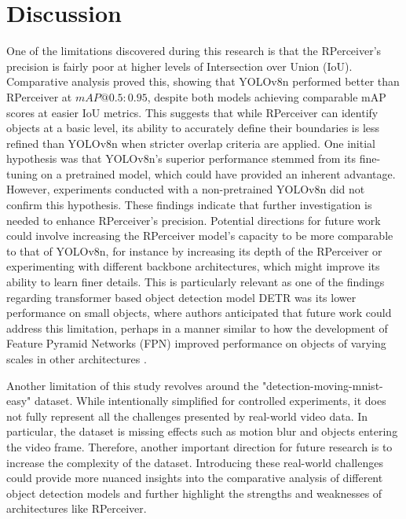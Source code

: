 \section{Discussion} \label{Discussion}

One of the limitations discovered during this research is that the RPerceiver's precision is fairly poor at higher levels of Intersection over Union (IoU). Comparative analysis proved this, showing that YOLOv8n performed better than RPerceiver at $mAP@0.5:0.95$, despite both models achieving comparable mAP scores at easier IoU metrics. This suggests that while RPerceiver can identify objects at a basic level, its ability to accurately define their boundaries is less refined than YOLOv8n when stricter overlap criteria are applied. One initial hypothesis was that YOLOv8n's superior performance stemmed from its fine-tuning on a pretrained model, which could have provided an inherent advantage. However, experiments conducted with a non-pretrained YOLOv8n did not confirm this hypothesis. These findings indicate that further investigation is needed to enhance RPerceiver's precision. Potential directions for future work could involve increasing the RPerceiver model's capacity to be more comparable to that of YOLOv8n, for instance by increasing its depth of the RPerceiver or experimenting with different backbone architectures, which might improve its ability to learn finer details. This is particularly relevant as one of the findings regarding transformer based object detection model DETR \cite{carionEndtoEndObjectDetection2020} was its lower performance on small objects, where authors anticipated that future work could address this limitation, perhaps in a manner similar to how the development of Feature Pyramid Networks (FPN) \cite{} improved performance on objects of varying scales in other architectures \cite{carionEndtoEndObjectDetection2020}.

Another limitation of this study revolves around the "detection-moving-mnist-easy" dataset. While intentionally simplified for controlled experiments, it does not fully represent all the challenges presented by real-world video data. In particular, the dataset is missing effects such as motion blur and objects entering the video frame. Therefore, another important direction for future research is to increase the complexity of the dataset. Introducing these real-world challenges could provide more nuanced insights into the comparative analysis of different object detection models and further highlight the strengths and weaknesses of architectures like RPerceiver.

